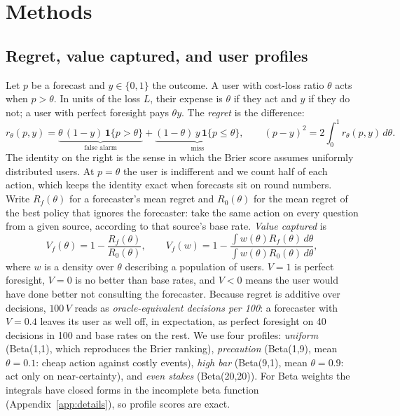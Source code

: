 \documentclass[10pt]{article}
\newcommand{\V}{V}
\begin{document}
\section{Methods}\label{sec:methods}
\subsection{Regret, value captured, and user profiles}
Let $p$ be a forecast and $y\in\{0,1\}$ the outcome. A user with cost-loss ratio $\theta$ acts when $p>\theta$. In units of the loss $L$, their expense is $\theta$ if they act and $y$ if they do not; a user with perfect foresight pays $\theta y$. The \emph{regret} is the difference:
\begin{equation}
r_\theta(p,y)=\underbrace{\theta\,(1-y)\,\mathbf{1}\{p>\theta\}}_{\text{false alarm}}+\underbrace{(1-\theta)\,y\,\mathbf{1}\{p\le\theta\}}_{\text{miss}} ,\qquad
(p-y)^2 = 2\int_0^1 r_\theta(p,y)\,d\theta .
\end{equation}
The identity on the right is the sense in which the Brier score assumes uniformly distributed users. At $p=\theta$ the user is indifferent and we count half of each action, which keeps the identity exact when forecasts sit on round numbers. Write $R_f(\theta)$ for a forecaster's mean regret and $R_0(\theta)$ for the mean regret of the best policy that ignores the forecaster: take the same action on every question from a given source, according to that source's base rate. \emph{Value captured} is
\begin{equation}
\V_f(\theta)=1-\frac{R_f(\theta)}{R_0(\theta)},\qquad
\V_f(w)=1-\frac{\int w(\theta)R_f(\theta)\,d\theta}{\int w(\theta)R_0(\theta)\,d\theta},
\end{equation}
where $w$ is a density over $\theta$ describing a population of users. $\V=1$ is perfect foresight, $\V=0$ is no better than base rates, and $\V<0$ means the user would have done better not consulting the forecaster. Because regret is additive over decisions, $100\,\V$ reads as \emph{oracle-equivalent decisions per 100}: a forecaster with $\V=0.4$ leaves its user as well off, in expectation, as perfect foresight on 40 decisions in 100 and base rates on the rest. We use four profiles: \emph{uniform} (Beta(1,1), which reproduces the Brier ranking), \emph{precaution} (Beta(1,9), mean $\theta=0.1$: cheap action against costly events), \emph{high bar} (Beta(9,1), mean $\theta=0.9$: act only on near-certainty), and \emph{even stakes} (Beta(20,20)). For Beta weights the integrals have closed forms in the incomplete beta function (Appendix~\ref{app:details}), so profile scores are exact.
\end{document}
